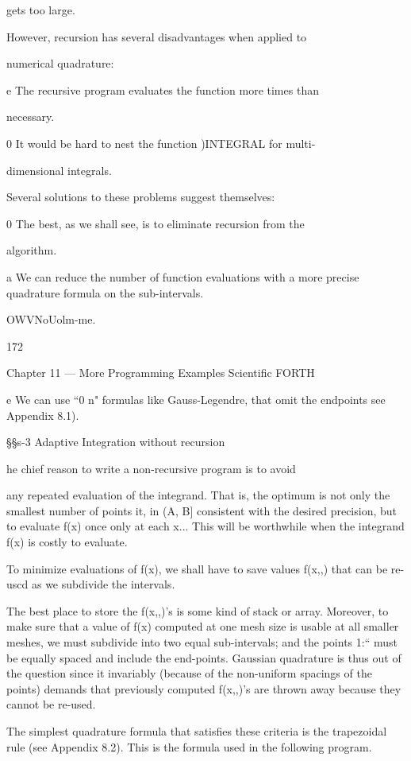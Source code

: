 {gets too large.

However, recursion has several disadvantages when applied to

numerical quadrature:

e The recursive program evaluates the function more times than

necessary.

0 It would be hard to nest the function )INTEGRAL for multi-

dimensional integrals.

Several solutions to these problems suggest themselves:

0 The best, as we shall see, is to eliminate recursion from the

algorithm.

a We can reduce the number of function evaluations with a more
precise quadrature formula on the sub-intervals.

OWVNoUolm-me.

172

Chapter 11 — More Programming Examples Scientiﬁc FORTH

e We can use “0 n" formulas like Gauss-Legendre, that omit
the endpoints see Appendix 8.1).

§§s-3 Adaptive Integration without recursion

he chief reason to write a non-recursive program is to avoid

any repeated evaluation of the integrand. That is, the optimum
is not only the smallest number of points it, in (A, B] consistent
with the desired precision, but to evaluate f(x) once only at each
x... This will be worthwhile when the integrand f(x) is costly to
evaluate.

To minimize evaluations of f(x), we shall have to save values
f(x,,) that can be re-uscd as we subdivide the intervals.

The best place to store the f(x,,)’s is some kind of stack or array.
Moreover, to make sure that a value of f(x) computed at one
mesh size is usable at all smaller meshes, we must subdivide into
two equal sub-intervals; and the points 1:“ must be equally spaced
and include the end-points. Gaussian quadrature is thus out of
the question since it invariably (because of the non-uniform
spacings of the points) demands that previously computed f(x,,)’s
are thrown away because they cannot be re-used.

The simplest quadrature formula that satisﬁes these criteria is the
trapezoidal rule (see Appendix 8.2). This is the formula used in
the following program.

}
